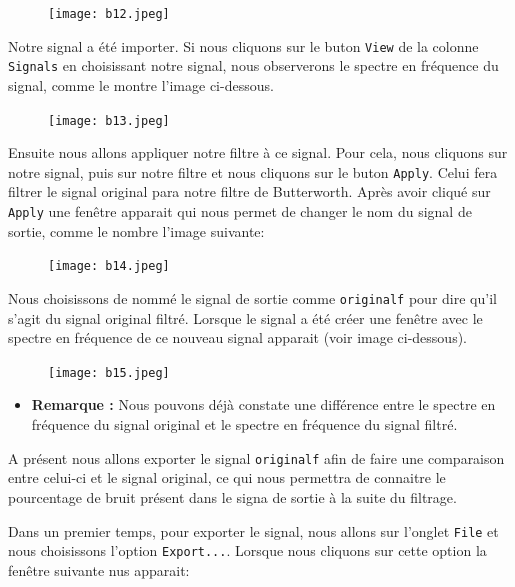\documentclass[conference,onecolumn]{IEEEtran}
\begin{document}
 \begin{figure}[H]
 \centering
    \texttt{[image: b12.jpeg]}
\end{figure}


Notre signal a été importer. Si nous cliquons sur le buton \texttt{View} de la colonne \texttt{Signals} en choisissant notre signal, nous observerons le spectre en fréquence du signal, comme le montre l'image ci-dessous.

 \begin{figure}[H]
 \centering
    \texttt{[image: b13.jpeg]}
\end{figure}


Ensuite nous allons appliquer notre filtre à ce signal. Pour cela, nous cliquons sur notre signal, puis sur notre filtre et nous cliquons sur le buton \texttt{Apply}. Celui fera filtrer le signal original para notre filtre de Butterworth. Après avoir cliqué sur \texttt{Apply} une fenêtre apparait qui nous permet de changer le nom du signal de sortie, comme le nombre l'image suivante:

 \begin{figure}[H]
 \centering
    \texttt{[image: b14.jpeg]}
\end{figure}


Nous choisissons de nommé le signal de sortie comme \texttt{originalf} pour dire qu'il s'agit du signal original filtré. Lorsque le signal a été créer une fenêtre avec le spectre en fréquence de ce nouveau signal apparait (voir image ci-dessous).

 \begin{figure}[H]
 \centering
    \texttt{[image: b15.jpeg]}
\end{figure}


\begin{itemize}
    \item[] \textbf{Remarque :} Nous pouvons déjà constate une différence entre le spectre en fréquence du signal original et le spectre en fréquence du signal filtré.
\end{itemize}

A présent nous allons exporter le signal \texttt{originalf} afin de faire une comparaison entre celui-ci et le signal original, ce qui nous permettra de connaitre le pourcentage de bruit présent dans le signa de sortie à la suite du filtrage. 

Dans un premier temps, pour exporter le signal, nous allons sur l'onglet \texttt{File} et nous choisissons l'option \texttt{Export...}. Lorsque nous cliquons sur cette option la fenêtre suivante nus apparait:
\end{document}
